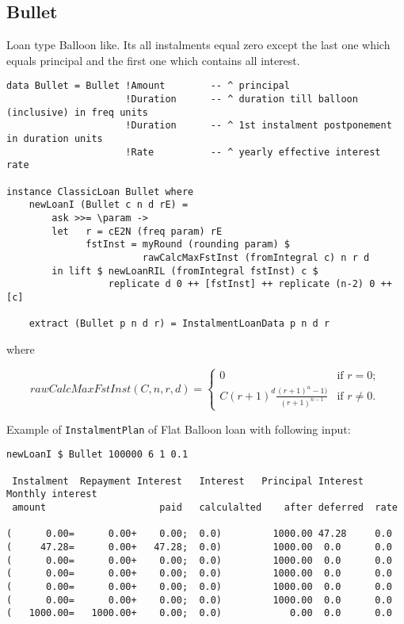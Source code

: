 \documentclass[letterpaper,11pt]{article}
\begin{document}
\subsection{Bullet}
Loan type Balloon like. Its all instalments equal zero except the last one which equals principal and the first
one which contains all interest.

{\small
\begin{verbatim}
data Bullet = Bullet !Amount        -- ^ principal
                     !Duration      -- ^ duration till balloon (inclusive) in freq units
                     !Duration      -- ^ 1st instalment postponement in duration units
                     !Rate          -- ^ yearly effective interest rate

instance ClassicLoan Bullet where
    newLoanI (Bullet c n d rE) =
        ask >>= \param ->
        let   r = cE2N (freq param) rE
              fstInst = myRound (rounding param) $
                        rawCalcMaxFstInst (fromIntegral c) n r d
        in lift $ newLoanRIL (fromIntegral fstInst) c $
                  replicate d 0 ++ [fstInst] ++ replicate (n-2) 0 ++ [c]

    extract (Bullet p n d r) = InstalmentLoanData p n d r
\end{verbatim}
}

where

\begin{equation}
rawCalcMaxFstInst (C, n, r, d) = \left\{ \begin{array}{ll}
                                    0 & \mbox{if $r=0$};\\
                                    C(r+1)^d \frac{(r+1)^n-1)}{(r+1)^{n-1}} & \mbox{if $r \neq 0$}.
                                    \end{array} \right.
\end{equation}

Example of {\tt InstalmentPlan} of Flat Balloon loan with following input:
{\footnotesize
\begin{verbatim}
newLoanI $ Bullet 100000 6 1 0.1

 Instalment  Repayment Interest   Interest   Principal Interest  Monthly interest
 amount                    paid   calculalted    after deferred  rate

(      0.00=      0.00+    0.00;  0.0)         1000.00 47.28     0.0
(     47.28=      0.00+   47.28;  0.0)         1000.00  0.0      0.0
(      0.00=      0.00+    0.00;  0.0)         1000.00  0.0      0.0
(      0.00=      0.00+    0.00;  0.0)         1000.00  0.0      0.0
(      0.00=      0.00+    0.00;  0.0)         1000.00  0.0      0.0
(      0.00=      0.00+    0.00;  0.0)         1000.00  0.0      0.0
(   1000.00=   1000.00+    0.00;  0.0)            0.00  0.0      0.0
\end{verbatim}
}
\end{document}
